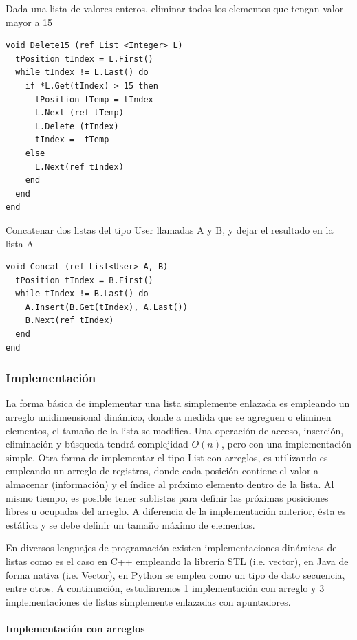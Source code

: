 Dada una lista de valores enteros, eliminar todos los elementos que tengan valor mayor a 15
\begin{lstlisting}[upquote=true, language=pseudo]
void Delete15 (ref List <Integer> L)
  tPosition tIndex = L.First()
  while tIndex != L.Last() do
    if *L.Get(tIndex) > 15 then
      tPosition tTemp = tIndex
      L.Next (ref tTemp)
      L.Delete (tIndex)
      tIndex =  tTemp
    else
      L.Next(ref tIndex)
    end
  end
end
\end{lstlisting}

Concatenar dos listas del tipo User llamadas A y B, y dejar el resultado en la lista A
\begin{lstlisting}[upquote=true, language=pseudo]
void Concat (ref List<User> A, B)
  tPosition tIndex = B.First()
  while tIndex != B.Last() do
    A.Insert(B.Get(tIndex), A.Last())
    B.Next(ref tIndex)
  end
end
\end{lstlisting}

\subsubsection{Implementación}

La forma básica de implementar una lista simplemente enlazada es empleando un arreglo unidimensional dinámico, donde a medida que se agreguen o eliminen elementos, el tamaño de la lista se modifica. Una operación de acceso, inserción, eliminación y búsqueda tendrá complejidad $O(n)$, pero con una implementación simple. Otra forma de implementar el tipo List con arreglos, es utilizando es empleando un arreglo de registros, donde cada posición contiene el valor a almacenar (información) y el índice al próximo elemento dentro de la lista. Al mismo tiempo, es posible tener sublistas para definir las próximas posiciones libres u ocupadas del arreglo. A diferencia de la implementación anterior, ésta es estática y se debe definir un tamaño máximo de elementos.

En diversos lenguajes de programación existen implementaciones dinámicas de listas como es el caso en C++ empleando la librería STL (i.e. vector), en Java de forma nativa (i.e. Vector), en Python se emplea como un tipo de dato secuencia, entre otros. A continuación, estudiaremos 1 implementación con arreglo y 3 implementaciones de listas simplemente enlazadas con apuntadores. 


\paragraph{Implementación con arreglos}

